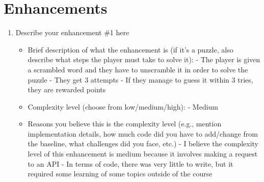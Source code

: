 \documentclass[11pt]{article}
\begin{document}
\section*{Enhancements}
\begin{enumerate}
    \item Describe your enhancement \#1 here
    \begin{itemize}
        \item Brief description of what the enhancement is (if it's a puzzle, also describe what steps the player must take to solve it):
            - The player is given a scrambled word and they have to unscramble it in order to solve the puzzle
            - They get 3 attempts
            - If they manage to guess it within 3 tries, they are rewarded points
        \item Complexity level (choose from low/medium/high):
            - Medium
        \item Reasons you believe this is the complexity level (e.g., mention implementation details, how much code did you have to add/change from the baseline, what challenges did you face, etc.)
            - I believe the complexity level of this enhancement is medium because it involves making a request to an API
            - In terms of code, there was very little to write, but it required some learning of some topics outside of the course
    \end{itemize}

\end{enumerate}
\end{document}

